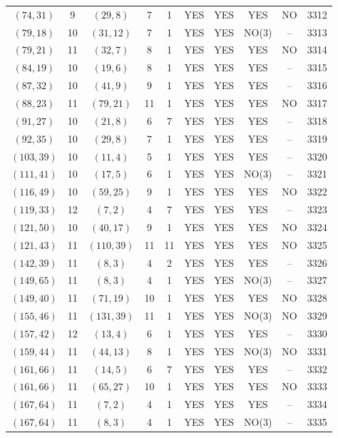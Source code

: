 \begin{longtable}{|c|c|c|c|c|c|c|c|c|c|}
$(74, 31)$ & 9 & $(29, 8)$ & 7 & 1 & YES & YES & YES & NO & 3312\\
$(79, 18)$ & 10 & $(31, 12)$ & 7 & 1 & YES & YES & NO(3) & -- & 3313\\
$(79, 21)$ & 11 & $(32, 7)$ & 8 & 1 & YES & YES & YES & NO & 3314\\
$(84, 19)$ & 10 & $(19, 6)$ & 8 & 1 & YES & YES & YES & -- & 3315\\
$(87, 32)$ & 10 & $(41, 9)$ & 9 & 1 & YES & YES & YES & -- & 3316\\
$(88, 23)$ & 11 & $(79, 21)$ & 11 & 1 & YES & YES & YES & NO & 3317\\
$(91, 27)$ & 10 & $(21, 8)$ & 6 & 7 & YES & YES & YES & -- & 3318\\
$(92, 35)$ & 10 & $(29, 8)$ & 7 & 1 & YES & YES & YES & -- & 3319\\
$(103, 39)$ & 10 & $(11, 4)$ & 5 & 1 & YES & YES & YES & -- & 3320\\
$(111, 41)$ & 10 & $(17, 5)$ & 6 & 1 & YES & YES & NO(3) & -- & 3321\\
$(116, 49)$ & 10 & $(59, 25)$ & 9 & 1 & YES & YES & YES & NO & 3322\\
$(119, 33)$ & 12 & $(7, 2)$ & 4 & 7 & YES & YES & YES & -- & 3323\\
$(121, 50)$ & 10 & $(40, 17)$ & 9 & 1 & YES & YES & YES & NO & 3324\\
$(121, 43)$ & 11 & $(110, 39)$ & 11 & 11 & YES & YES & YES & NO & 3325\\
$(142, 39)$ & 11 & $(8, 3)$ & 4 & 2 & YES & YES & YES & -- & 3326\\
$(149, 65)$ & 11 & $(8, 3)$ & 4 & 1 & YES & YES & NO(3) & -- & 3327\\
$(149, 40)$ & 11 & $(71, 19)$ & 10 & 1 & YES & YES & YES & NO & 3328\\
$(155, 46)$ & 11 & $(131, 39)$ & 11 & 1 & YES & YES & NO(3) & NO & 3329\\
$(157, 42)$ & 12 & $(13, 4)$ & 6 & 1 & YES & YES & YES & -- & 3330\\
$(159, 44)$ & 11 & $(44, 13)$ & 8 & 1 & YES & YES & NO(3) & NO & 3331\\
$(161, 66)$ & 11 & $(14, 5)$ & 6 & 7 & YES & YES & YES & -- & 3332\\
$(161, 66)$ & 11 & $(65, 27)$ & 10 & 1 & YES & YES & YES & NO & 3333\\
$(167, 64)$ & 11 & $(7, 2)$ & 4 & 1 & YES & YES & YES & -- & 3334\\
$(167, 64)$ & 11 & $(8, 3)$ & 4 & 1 & YES & YES & NO(3) & -- & 3335\\

\end{longtable}
